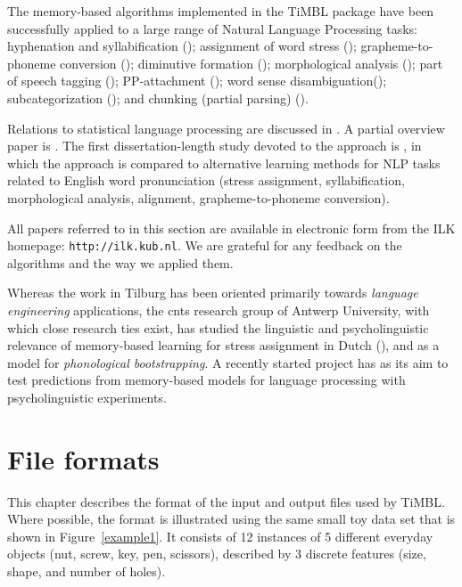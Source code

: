 \documentclass{report}
\begin{document}
The memory-based algorithms implemented in the TiMBL package have been
successfully applied to a large range of Natural Language Processing
tasks: hyphenation and syllabification (\cite{Daelemans+92b});
assignment of word stress (\cite{Daelemans+94b}); grapheme-to-phoneme
conversion (\cite{Daelemans+96}); diminutive formation
(\cite{Daelemans+97e}); morphological analysis
(\cite{Vandenbosch+96}); part of speech tagging
(\cite{Daelemans+96b}); PP-attachment (\cite{Zavrel+97b}); word sense
disambiguation(\cite{Veenstra+98}); subcategorization
(\cite{Buchholz98}); and chunking (partial parsing)
(\cite{Veenstra98}).

Relations to statistical language processing are discussed in
\cite{Zavrel+97}.  A partial overview paper is \cite{Daelemans95}.
The first dissertation-length study devoted to the approach is
\cite{VandenBosch97}, in which the approach is compared to alternative
learning methods for NLP tasks related to English word pronunciation
(stress assignment, syllabification, morphological analysis,
alignment, grapheme-to-phoneme conversion).

All papers referred to in this section are available in electronic
form from the {\sc ILK} homepage: {\tt http://ilk.kub.nl}.  We are
grateful for any feedback on the algorithms and the way we applied
them.

Whereas the work in Tilburg has been oriented primarily towards {\em
language engineering} applications, the {\sc cnts} research group of
Antwerp University, with which close research ties exist, has studied
the linguistic and psycholinguistic relevance of memory-based learning
for stress assignment in Dutch (\cite{Daelemans+94b,Gillis+95}), and
as a model for {\em phonological bootstrapping}.  A recently started
project has as its aim to test predictions from memory-based models
for language processing with psycholinguistic experiments.

\chapter{File formats}
\label{fileformats}

This chapter describes the format of the input and output files used
by TiMBL. Where possible, the format is illustrated using the same
small toy data set that is shown in Figure~\ref{example1}. It consists
of 12 instances of 5 different everyday objects (nut, screw, key, pen,
scissors), described by 3 discrete features (size, shape, and number
of holes).
\end{document}
